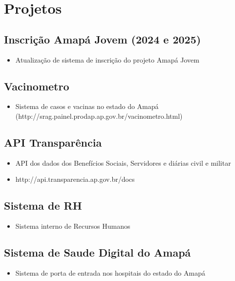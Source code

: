 \documentclass{article}
\begin{document}
\section{\faFlask\enspace Projetos}

\subsection{Inscrição Amapá Jovem (2024 e 2025)}
\begin{itemize}
  \item Atualização de sistema de inscrição do projeto Amapá Jovem
\end{itemize}

\subsection{Vacinometro}
\begin{itemize}
  \item Sistema de casos e vacinas no estado do Amapá (http://srag.painel.prodap.ap.gov.br/vacinometro.html)
\end{itemize}

\subsection{API Transparência}
\begin{itemize}
  \item API dos dados dos Benefícios Sociais, Servidores e diárias civil e militar
  \item http://api.transparencia.ap.gov.br/docs
\end{itemize}

\subsection{Sistema de RH}
\begin{itemize}
  \item Sistema interno de Recursos Humanos
\end{itemize}

\subsection{Sistema de Saude Digital do Amapá}
\begin{itemize}
  \item Sistema de porta de entrada nos hospitais do estado do Amapá
\end{itemize}
\end{document}
